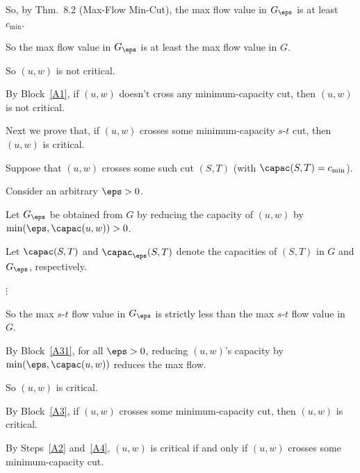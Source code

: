\begin{longFormProof}
\begin{block}
    \step So, by Thm.~8.2 (Max-Flow Min-Cut),  the max flow value in $G_\eps$ is at least $c_{\min}$.

    \step So the max flow value in $G_\eps$ is at least the max flow value in $G$.
    
    \step So $(u, w)$ is not critical.
    
  \end{block}
  
  \step\label{A2}
  By Block~\ref{A1}, if $(u, w)$ doesn't cross any minimum-capacity cut, then $(u, w)$ is not critical.

  \smallskip \lineacross 

  \step Next we prove that, if  $(u, w)$ crosses some minimum-capacity $s$-$t$ cut, then $(u, w)$ is critical. 

  \begin{block}\label{A3}
    
    \step Suppose that $(u, w)$ crosses some such cut $(S, T)$ (with $\capac(S, T)= c_{\min}$).
    
    \begin{block}\label{A31}

      \step Consider an arbitrary $\eps>0$.

      \step Let $G_\eps$ be obtained from $G$ by reducing the capacity of $(u, w)$  by $\min(\eps, \capac(u,w))>0$.

      \step Let $\capac(S, T)$ and $\capac_\eps(S, T)$ denote the capacities of $(S, T)$ in $G$ and $G_\eps$, respectively. 

      \begin{blue}

        \step \REPLACEME

        \step $\vdots$          %

      \end{blue}
      
      \step So the max $s$-$t$ flow value in $G_\eps$ is strictly less than the max $s$-$t$ flow value in $G$.

    \end{block}

    \step By Block~\ref{A31}, for all $\eps>0$,  reducing $(u, w)$'s capacity by $\min(\eps, \capac(u, w))$
    reduces the max flow.

    \step So $(u, w)$ is critical.
    
  \end{block}
  
  \step\label{A4}
  By Block~\ref{A3}, if $(u, w)$ crosses some minimum-capacity cut, then $(u, w)$ is critical.
  
  \smallskip \lineacross 

  \step By Steps~\ref{A2} and~\ref{A4}, $(u, w)$ is critical if and only if $(u, w)$ crosses some minimum-capacity cut. 

\end{longFormProof}


